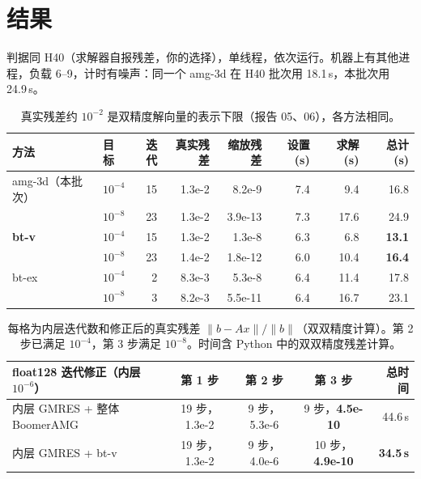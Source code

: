 \documentclass[11pt,a4paper]{ctexart}
\begin{document}
\section{结果}
判据同 H40（求解器自报残差，你的选择），单线程，依次运行。机器上有其他进程，负载 6--9，计时有噪声：同一个 amg-3d 在 H40 批次用 18.1\,s，本批次用 24.9\,s。
\begin{table}[H]
\centering
\small
\begin{tabular}{llrrrrrr}
\toprule
方法 & 目标 & 迭代 & 真实残差 & 缩放残差 & 设置 (s) & 求解 (s) & 总计 (s) \\
\midrule
amg-3d（本批次） & $10^{-4}$ & 15 & 1.3e-2 & 8.2e-9 & 7.4 & 9.4 & 16.8 \\
 & $10^{-8}$ & 23 & 1.3e-2 & 3.9e-13 & 7.3 & 17.6 & 24.9 \\
\textbf{bt-v} & $10^{-4}$ & 15 & 1.3e-2 & 1.3e-8 & 6.3 & 6.8 & \textbf{13.1} \\
 & $10^{-8}$ & 23 & 1.4e-2 & 1.8e-12 & 6.0 & 10.4 & \textbf{16.4} \\
bt-ex & $10^{-4}$ & 2 & 8.3e-3 & 5.3e-8 & 6.4 & 11.4 & 17.8 \\
 & $10^{-8}$ & 3 & 8.2e-3 & 5.5e-11 & 6.4 & 16.7 & 23.1 \\
\bottomrule
\end{tabular}
\caption{真实残差约 $10^{-2}$ 是双精度解向量的表示下限（报告 05、06），各方法相同。}
\end{table}

\begin{table}[H]
\centering
\small
\begin{tabular}{lcccr}
\toprule
float128 迭代修正（内层 $10^{-6}$） & 第 1 步 & 第 2 步 & 第 3 步 & 总时间 \\
\midrule
内层 GMRES + 整体 BoomerAMG & 19 步，1.3e-2 & 9 步，5.3e-6 & 9 步，\textbf{4.5e-10} & 44.6\,s \\
内层 GMRES + bt-v & 19 步，1.3e-2 & 9 步，4.0e-6 & 10 步，\textbf{4.9e-10} & \textbf{34.5\,s} \\
\bottomrule
\end{tabular}
\caption{每格为内层迭代数和修正后的真实残差 $\|b-Ax\|/\|b\|$（双双精度计算）。第 2 步已满足 $10^{-4}$，第 3 步满足 $10^{-8}$。时间含 Python 中的双双精度残差计算。}
\end{table}
\end{document}
